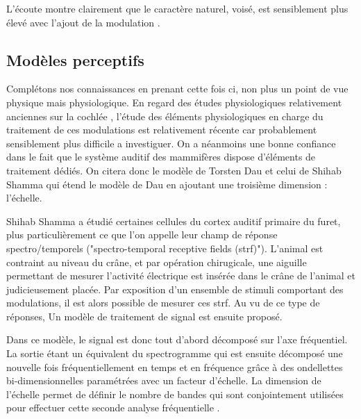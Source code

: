 L'écoute montre clairement que le caractère naturel, voisé, est sensiblement plus élevé avec l'ajout de la modulation .

\subsection{Modèles perceptifs}

Complétons nos connaissances en prenant cette fois ci, non plus un point de vue physique mais physiologique. En regard des études physiologiques relativement anciennes sur la cochlée \cite{}, l'étude des éléments physiologiques en charge du traitement de ces modulations est relativement récente car probablement sensiblement plus difficile a investiguer. On a néanmoins une bonne confiance dans le fait que le système auditif des mammifères dispose d'éléments de traitement dédiés. On citera donc le modèle de Torsten Dau \cite{dau1997modeling} et celui de Shihab Shamma \cite{fritz2003rapid} qui étend le modèle de Dau en ajoutant une troisième dimension : l'échelle.

Shihab Shamma a étudié certaines cellules du cortex auditif primaire du furet, plus particulièrement ce que l'on appelle leur champ de réponse spectro/temporels ("spectro-temporal receptive fields (strf)"). L'animal est contraint au niveau du crâne, et par opération chirugicale, une aiguille permettant de mesurer l'activité électrique est insérée dans le crâne de l'animal et judicieusement placée. Par exposition d'un ensemble de stimuli comportant des modulations, il est alors possible de mesurer ces strf. Au vu de ce type de réponses, Un modèle de traitement de signal est ensuite proposé.

Dans ce modèle, le signal est donc tout d'abord décomposé sur l'axe fréquentiel. La sortie étant un équivalent du spectrogramme qui est ensuite décomposé une nouvelle fois fréquentiellement en temps et en fréquence grâce à des ondellettes bi-dimensionnelles paramétrées avec un facteur d'échelle. La dimension de l'échelle permet de définir le nombre de bandes qui sont conjointement utilisées pour effectuer cette seconde analyse fréquentielle .

